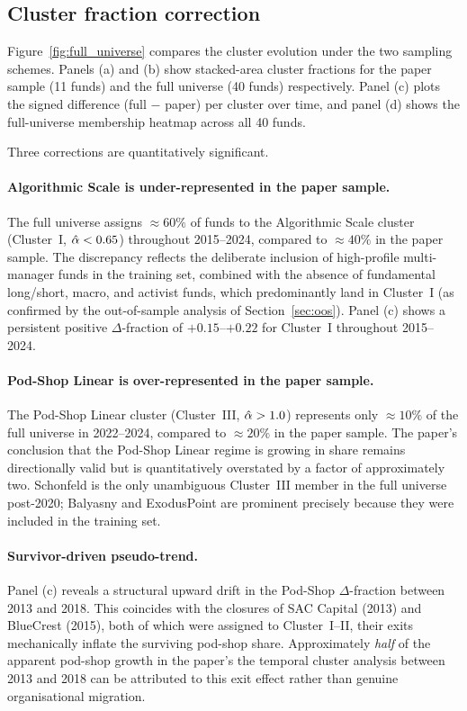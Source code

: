 \subsection{Cluster fraction correction}

Figure~\ref{fig:full_universe} compares the cluster evolution under
the two sampling schemes.
Panels (a) and (b) show stacked-area cluster fractions for the
paper sample (11 funds) and the full universe (40 funds) respectively.
Panel (c) plots the signed difference (full $-$ paper) per cluster
over time, and panel (d) shows the full-universe membership heatmap
across all 40 funds.

Three corrections are quantitatively significant.

\paragraph{Algorithmic Scale is under-represented in the paper sample.}
The full universe assigns ${\approx}60\%$ of funds to the
Algorithmic Scale cluster (Cluster~I, $\hat{\alpha} < 0.65$) throughout
2015--2024, compared to ${\approx}40\%$ in the paper sample.
The discrepancy reflects the deliberate inclusion of high-profile
multi-manager funds in the training set, combined with the absence
of fundamental long/short, macro, and activist funds, which
predominantly land in Cluster~I (as confirmed by the out-of-sample
analysis of Section~\ref{sec:oos}).
Panel (c) shows a persistent positive $\Delta$-fraction of
$+0.15$--$+0.22$ for Cluster~I throughout 2015--2024.

\paragraph{Pod-Shop Linear is over-represented in the paper sample.}
The Pod-Shop Linear cluster (Cluster~III, $\hat{\alpha} > 1.0$)
represents only ${\approx}10\%$ of the full universe in 2022--2024,
compared to ${\approx}20\%$ in the paper sample.
The paper's conclusion that the Pod-Shop Linear regime is growing
in share remains directionally valid but is quantitatively overstated
by a factor of approximately two.
Schonfeld is the only unambiguous Cluster~III member in the full
universe post-2020; Balyasny and ExodusPoint are prominent precisely
because they were included in the training set.

\paragraph{Survivor-driven pseudo-trend.}
Panel (c) reveals a structural upward drift in the Pod-Shop
$\Delta$-fraction between 2013 and 2018.
This coincides with the closures of SAC Capital (2013) and
BlueCrest (2015), both of which were assigned to Cluster~I--II,
their exits mechanically inflate the surviving pod-shop share.
Approximately \emph{half} of the apparent pod-shop growth in the
paper's the temporal cluster analysis between 2013 and 2018 can
be attributed to this exit effect rather than genuine organisational
migration.

